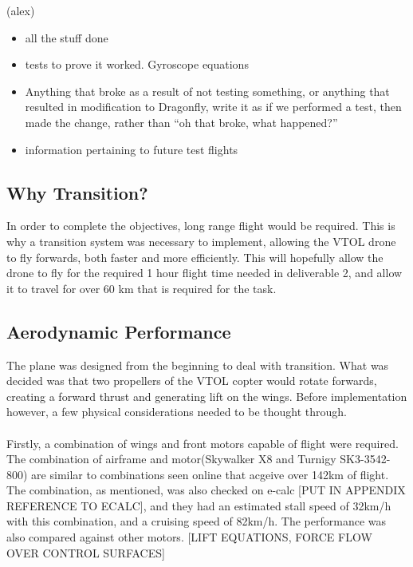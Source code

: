 \color{red}
(alex)
\begin{itemize}
\item all the stuff done
\item tests to prove it worked. Gyroscope equations
\item Anything that broke as a result of not testing something, or anything that resulted in modification to Dragonfly, write it as if we performed a test, then made the change, rather than ``oh that broke, what happened?''
\item information pertaining to future test flights
\end{itemize}
\color{black}
\subsection{Why Transition?}
In order to complete the objectives, long range flight would be required. This is why a transition system was necessary to implement, allowing the VTOL drone to fly forwards, both faster and more efficiently. This will hopefully allow the drone to fly for the required 1 hour flight time needed in deliverable 2, and allow it to travel for over 60 km that is required for the task. 

\subsection{Aerodynamic Performance}
The plane was designed from the beginning to deal with transition. What was decided was that two propellers of the VTOL copter would rotate forwards, creating a forward thrust and generating lift on the wings.  Before implementation however, a few physical considerations needed to be thought through.
\\\\
Firstly, a combination of wings and front motors capable of flight were required.  The combination of airframe and motor(Skywalker X8 and Turnigy SK3-3542-800) are similar to combinations seen online that acgeive over 142km of flight. The combination, as mentioned, was also checked on e-calc \color{red}[PUT IN APPENDIX REFERENCE TO ECALC]\color{black}, and they had an estimated stall speed of 32km/h with this combination, and a cruising speed of 82km/h. The performance was also compared against other motors. [LIFT EQUATIONS, FORCE FLOW OVER CONTROL SURFACES]

